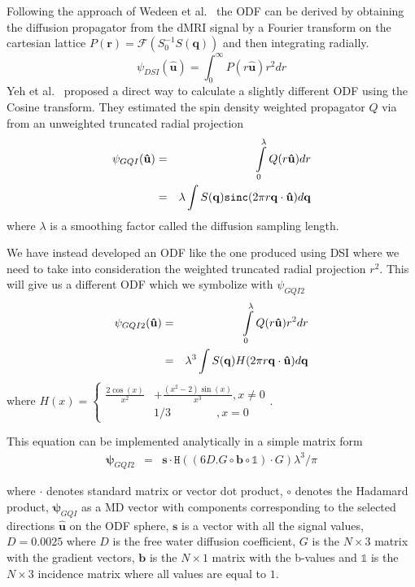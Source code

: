 \documentclass[9pt,conference,a4paper]{IEEEtran}
\begin{document}
Following the approach of Wedeen et al.~\cite{WWS+08} 
the ODF can be derived by obtaining the diffusion propagator from the dMRI signal
by a Fourier transform on the cartesian lattice  $P(\mathbf{r})=\mathcal{F}(S_0^{-1}S(\mathbf{q}))$ and then integrating radially. 
\begin{equation}
\psi_{DSI}(\hat{\mathbf{u}})=\int_{0}^{\infty}P(r\hat{\mathbf{u}})r^{2}dr\label{eq:ODF_DSI}
\end{equation}
Yeh
et al.~\cite{Yeh2010} proposed a direct way to calculate a slightly
different ODF using the Cosine transform. 
They estimated the spin density weighted propagator $Q$ via
from an unweighted truncated radial projection
\begin{eqnarray}
\psi_{GQI}(\mathbf{\hat{u}}) & = & \intop_{0}^{\lambda}Q(r\mathbf{\hat{u}})dr\label{eq:SDF}\nonumber\\
 & = & \lambda\int S(\mathbf{q})\mathtt{sinc}(2\pi r\mathbf{q}\cdot\mathbf{\hat{u}})d\mathbf{q}
\end{eqnarray}
where $\lambda$ is a smoothing factor called the diffusion sampling length.

We have instead developed an ODF like the one produced using
DSI where we need to take into consideration the weighted truncated
radial projection $r^2$. This will give us a different ODF which we symbolize
with $\psi_{GQI2}$\begin{eqnarray}
\psi_{GQI2}(\mathbf{\hat{u}}) & = & \intop_{0}^{\lambda}Q(r\mathbf{\hat{u}})r^{2}dr\nonumber\label{eq:SDF2}\\
 & = & \lambda^{3}\int S(\mathbf{q})H(2\pi r\mathbf{q}\cdot\mathbf{\hat{u}})d\mathbf{q}\end{eqnarray}
\noindent where $H(x)=\begin{cases}
\frac{2\cos(x)}{x^{2}} & +\frac{(x^{2}-2)\sin(x)}{x^{3}},x\neq0\\
 & 1/3\qquad\qquad,x=0\end{cases}$.
\begin{flushleft}
This equation can be implemented analytically in a simple matrix form
\begin{eqnarray}
\bm{\psi}_{GQI2} & = & \mathbf{s}\cdot\mathtt{H}((6D.G\circ\mathbf{b}\circ\mathbb{1})\cdot G)\lambda^{3}/\pi\label{eq:GQI2}
\end{eqnarray}

\par\end{flushleft}

\begin{flushleft}
where $\cdot$ denotes standard matrix or vector dot product, $\circ$
denotes the Hadamard product,  $\bm{\psi}_{GQI}$ as a
MD vector with components corresponding to the selected
directions $\hat{\mathbf{u}}$ on the ODF sphere, $\mathbf{s}$ is
a vector with all the signal values, $D=0.0025$
where $D$ is the free water diffusion coefficient,
$G$ is the $N\times3$ matrix with the gradient vectors, $\mathbf{b}$
is the $N\times1$ matrix with the b-values and $\mathbb{1}$ is the
$N\times3$ incidence matrix where all values are equal to $1$.
\par\end{flushleft}
\end{document}
